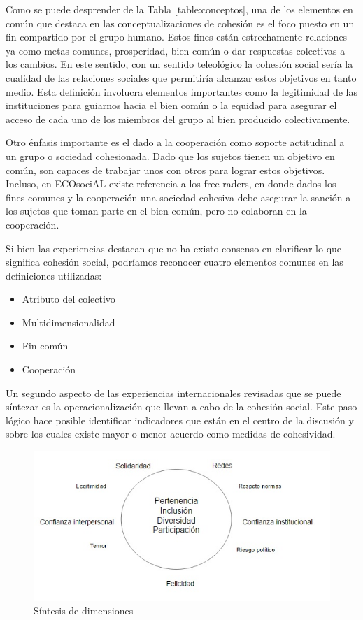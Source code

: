 \documentclass[
  12pt,
]{book}
\begin{document}
Como se puede desprender de la Tabla {[}table:conceptos{]}, una de los
elementos en común que destaca en las conceptualizaciones de cohesión es
el foco puesto en un fin compartido por el grupo humano. Estos fines
están estrechamente relaciones ya como metas comunes, prosperidad, bien
común o dar respuestas colectivas a los cambios. En este sentido, con un
sentido teleológico la cohesión social sería la cualidad de las
relaciones sociales que permitiría alcanzar estos objetivos en tanto
medio. Esta definición involucra elementos importantes como la
legitimidad de las instituciones para guiarnos hacia el bien común o la
equidad para asegurar el acceso de cada uno de los miembros del grupo al
bien producido colectivamente.

Otro énfasis importante es el dado a la cooperación como soporte
actitudinal a un grupo o sociedad cohesionada. Dado que los sujetos
tienen un objetivo en común, son capaces de trabajar unos con otros para
lograr estos objetivos. Incluso, en ECOsociAL existe referencia a los
free-raders, en donde dados los fines comunes y la cooperación una
sociedad cohesiva debe asegurar la sanción a los sujetos que toman parte
en el bien común, pero no colaboran en la cooperación.

Si bien las experiencias destacan que no ha existo consenso en
clarificar lo que significa cohesión social, podríamos reconocer cuatro
elementos comunes en las definiciones utilizadas:

\begin{itemize}
\item
  Atributo del colectivo
\item
  Multidimensionalidad
\item
  Fin común
\item
  Cooperación
\end{itemize}

Un segundo aspecto de las experiencias internacionales revisadas que se
puede síntezar es la operacionalización que llevan a cabo de la cohesión
social. Este paso lógico hace posible identificar indicadores que están
en el centro de la discusión y sobre los cuales existe mayor o menor
acuerdo como medidas de cohesividad.

\begin{figure}[H]

{\centering \includegraphics[width=0.75\linewidth]{inputs/images/comun} 

}

\caption{Síntesis de dimensiones}\label{fig:unnamed-chunk-3}
\end{figure}
\end{document}
